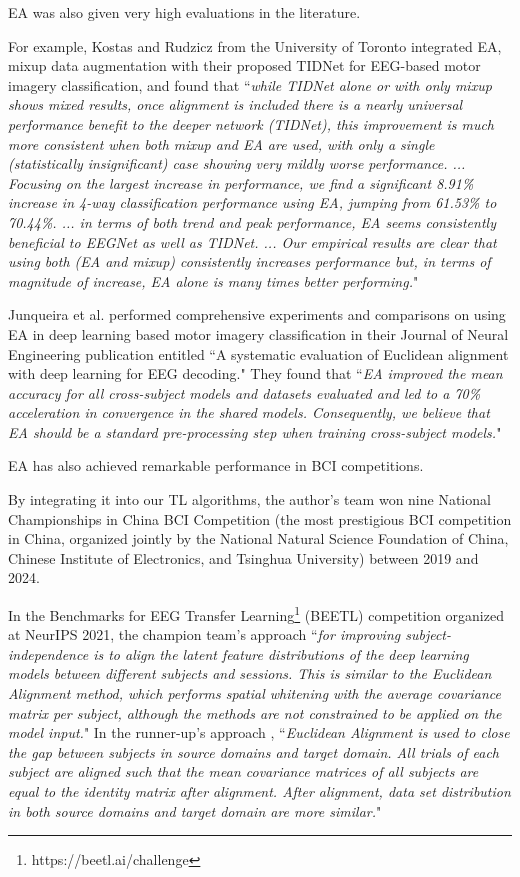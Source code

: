 \documentclass[journal]{IEEEtran}
\begin{document}
EA was also given very high evaluations in the literature.

For example, Kostas and Rudzicz \cite{Kostas2020} from the University of Toronto integrated EA, mixup data augmentation with their proposed TIDNet for EEG-based motor imagery classification, and found that ``\emph{while TIDNet alone or with only mixup shows mixed results, once alignment is included there is a nearly universal performance benefit to the deeper network (TIDNet), this improvement is much more consistent when both mixup and EA are used, with only a single (statistically insignificant) case showing very mildly worse performance. ... Focusing on the largest increase in performance, we find a significant 8.91\% increase in 4-way classification performance using EA, jumping from 61.53\% to 70.44\%. ... in terms of both trend and peak performance, EA seems consistently beneficial to EEGNet as well as TIDNet. ... Our empirical results are clear that using both (EA and mixup) consistently increases performance but, in terms of magnitude of increase, EA alone is many times better performing.}"

Junqueira et al. \cite{Junqueira2024} performed comprehensive experiments and comparisons on using EA in deep learning based motor imagery classification in their Journal of Neural Engineering publication entitled ``A systematic evaluation of Euclidean alignment with deep learning for EEG decoding." They found that ``\emph{EA improved the mean accuracy for all cross-subject models and datasets evaluated and led to a 70\% acceleration in convergence in the shared models. Consequently, we believe that EA should be a standard pre-processing step when training cross-subject models.}"

EA has also achieved remarkable performance in BCI competitions.

By integrating it into our TL algorithms, the author's team won nine National Championships in China BCI Competition (the most prestigious BCI competition in China, organized jointly by the National Natural Science Foundation of China, Chinese Institute of Electronics, and Tsinghua University) between 2019 and 2024.

In the Benchmarks for EEG Transfer Learning\footnote{https://beetl.ai/challenge} (BEETL) competition organized at NeurIPS 2021, the champion team's approach \cite{Wei2022} ``\emph{for improving subject-independence is to align the latent feature distributions of the deep learning models between different subjects and sessions. This is similar to the Euclidean Alignment method, which performs spatial whitening with the average covariance matrix per subject, although the methods are not constrained to be applied on the model input.}" In the runner-up's approach \cite{Wei2022}, ``\emph{Euclidean Alignment is used to close the gap between subjects in source domains and target domain. All trials of each subject are aligned such that the mean covariance matrices of all subjects are equal to the identity matrix after alignment. After alignment, data set distribution in both source domains and target domain are more similar.}"
\end{document}
